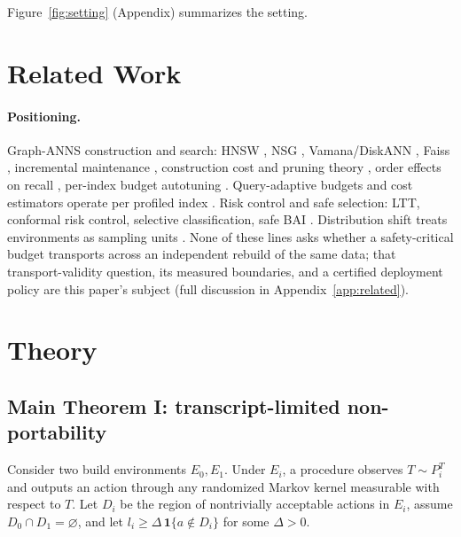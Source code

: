 \documentclass{article}
\begin{document}
Figure~\ref{fig:setting} (Appendix) summarizes the setting.

\section{Related Work}
\label{sec:related}

\paragraph{Positioning.}
Graph-ANNS construction and search: HNSW \citep{malkov2020hnsw}, NSG \citep{fu2019nsg},
Vamana/DiskANN \citep{subramanya2019diskann}, Faiss \citep{johnson2021faiss}, incremental maintenance
\citep{xu2022maintenance}, construction cost and pruning theory \citep{prokhorenkova2020graph}, order
effects on recall \citep{elliott2024order}, per-index budget autotuning \citep{bae2026qbat}.
Query-adaptive budgets and cost estimators operate per profiled index
\citep{li2020learned,chatzakis2025darth,horchidan2025conann,wang2026annie,zhang2026exploration}. Risk
control and safe selection: LTT, conformal risk control, selective classification, safe BAI
\citep{angelopoulos2025ltt,bates2021rcps,angelopoulos2024crc,elyaniv2010selective,wang2022safebai,garivier2016bai}.
Distribution shift treats environments as sampling units
\citep{bendavid2010theory,johansson2019support,duchi2025multienv}. None of these lines asks whether a
safety-critical budget transports across an independent rebuild of the same data; that transport-validity
question, its measured boundaries, and a certified deployment policy are this paper's subject (full
discussion in Appendix~\ref{app:related}).

\section{Theory}
\label{sec:theory}

\subsection{Main Theorem I: transcript-limited non-portability}

Consider two build environments $E_0,E_1$. Under $E_i$, a procedure observes $T\sim P_i^{T}$ and outputs an
action through any randomized Markov kernel measurable with respect to $T$. Let $D_i$ be the region of
nontrivially acceptable actions in $E_i$, assume $D_0\cap D_1=\varnothing$, and let
$l_i\ge\Delta\,\mathbf{1}\{a\notin D_i\}$ for some $\Delta>0$.
\end{document}
